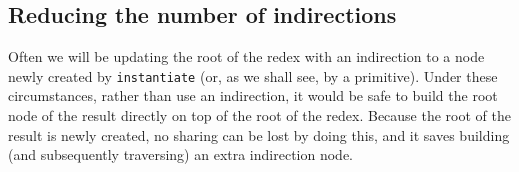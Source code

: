 \subsection{Reducing the number of indirections}
\label{sect:templ:inst-and-upd}

Often we will be updating the root of the redex with an indirection
to a node newly created by \mbox{\tt instantiate} (or, as we shall see, by a
primitive).
Under these circumstances, rather than use an indirection,
it would be safe to build the root node of the result directly on top
of the root of the redex.  Because the root of the result is newly created,
no sharing can be lost by doing this, and it saves building (and subsequently
traversing) an extra indirection node.

